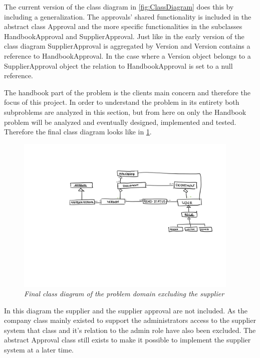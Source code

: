 The current version of the class diagram in \cref{fig:ClassDiagram} does this by including a generalization. The approvals' shared functionality is included in the abstract class Approval and the more specific functionalities in the subclasses HandbookApproval and SupplierApproval.
Just like in the early version of the class diagram SupplierApproval is aggregated by Version and Version contains a reference to HandbookApproval.
In the case where a Version object belongs to a SupplierApproval object the relation to HandbookApproval is set to a null reference.

The handbook part of the problem is the clients main concern and therefore the focus of this project.
In order to understand the problem in its entirety both subproblems are analyzed in this section, but from here on  only the Handbook problem will be analyzed and eventually designed, implemented and tested.
Therefore the final class diagram looks like in \cref{fig:ClassDiagramNoSupplier}.

\begin{figure}[H]
	\centering
	\includegraphics[width=0.95\textwidth]{billeder/classDiagramNoSupplier.jpg}
	\caption{\textit{Final class diagram of the problem domain excluding the supplier
	}\label{fig:ClassDiagramNoSupplier}}
\end{figure}

In this diagram the supplier and the supplier approval are not included.
As the company class mainly existed to support the administrators access to the supplier system that class and it's relation to the admin role have also been excluded.
The abstract Approval class still exists to make it possible to implement the supplier system at a later time.